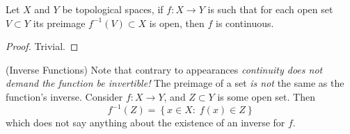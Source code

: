 \begin{thm}
Let $X$ and $Y$ be topological spaces, if $f:X\to Y$ is such
that for each open set $V\subset Y$ its preimage $f^{-1}(V)\subset X$
is open, then $f$ is continuous.
\end{thm}
\begin{proof}
Trivial.
\end{proof}
\begin{rmk}{(Inverse Functions)}
Note that contrary to appearances \emph{continuity does not demand the
  function be invertible!} The preimage of a set \emph{is not} the
same as the function's inverse. Consider $f:X\to Y$, and $Z\subset Y$
is some open set. Then
\begin{equation}
f^{-1}(Z) = \left\{x\in X:\; f(x)\in Z\right\}
\end{equation}
which does not say anything about the existence of an inverse for $f$.
\end{rmk}

